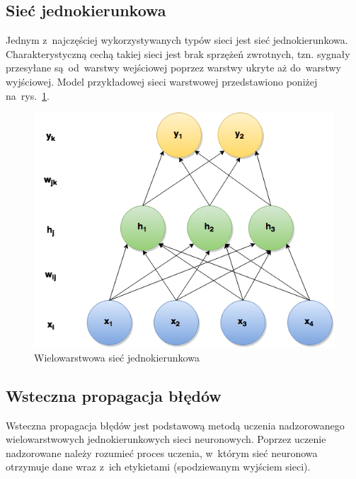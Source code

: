 \subsection{Sieć jednokierunkowa}
Jednym z~najczęściej wykorzystywanych typów sieci jest sieć jednokierunkowa. Charakterystyczną cechą takiej
sieci jest brak sprzężeń zwrotnych, tzn. sygnały przesyłane są~od~warstwy wejściowej poprzez warstwy ukryte
aż do~warstwy wyjściowej. Model przykładowej sieci warstwowej przedstawiono poniżej na~rys.~\ref{rys.siec-feed-forward}.

\begin{figure}[H]
	\centering
	\includegraphics[width=0.9\linewidth]{img/mgr_backprop_net.png}
	\caption{Wielowarstwowa sieć jednokierunkowa}
	\label{rys.siec-feed-forward}
\end{figure}

\subsection{Wsteczna propagacja błędów} \label{ssec:backpropagation}
Wsteczna propagacja błędów jest podstawową metodą uczenia nadzorowanego wielowarstwowych jednokierunkowych
sieci neuronowych. Poprzez uczenie nadzorowane należy rozumieć proces uczenia, w~którym sieć neuronowa
otrzymuje dane wraz z~ich etykietami (spodziewanym wyjściem sieci).

